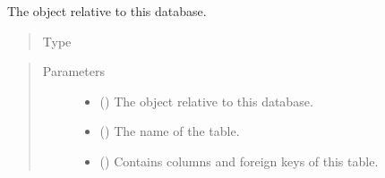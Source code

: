 \documentclass[letterpaper,10pt,english]{sphinxmanual}
\begin{document}
\begin{fulllineitems}
\begin{fulllineitems}
\begin{quote}
\begin{description}
\end{description}\end{quote}

\end{fulllineitems}


\begin{fulllineitems}
\label{\detokenize{model:mini_sql.model.table.Table.__metadata}}
\sphinxAtStartPar
The  object relative to this database.
\begin{quote}\begin{description}
\item[{Type}] \leavevmode
\sphinxAtStartPar
{\hyperref[\detokenize{metadata:mini_sql.metadata.MetaData}]{}}

\end{description}\end{quote}

\end{fulllineitems}

\begin{quote}\begin{description}
\item[{Parameters}] \leavevmode\begin{itemize}
\item {} 
\sphinxAtStartPar
{} ({\hyperref[\detokenize{metadata:mini_sql.metadata.MetaData}]{}}) \textendash{} The  object relative to this database.

\item {} 
\sphinxAtStartPar
{} () \textendash{} The name of the table.

\item {} 
\sphinxAtStartPar
{} (\sphinxstyleliteralemphasis{\sphinxupquote{{[}}}{\hyperref[\detokenize{model:mini_sql.model.column.Column}]{\sphinxcrossref{\sphinxstyleliteralemphasis{\sphinxupquote{Column}}}}}\sphinxstyleliteralemphasis{\sphinxupquote{{]}}}) \textendash{} Contains columns and foreign keys of this table.


\end{itemize}
\end{description}
\end{quote}
\end{fulllineitems}
\end{document}
